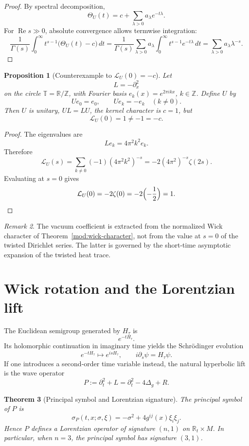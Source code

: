 \documentclass[11pt,a4paper]{article}
\numberwithin{equation}{section}
\newtheorem{theorem}{Theorem}[section]
\newtheorem{proposition}[theorem]{Proposition}
\theoremstyle{definition}
\theoremstyle{remark}
\newtheorem{remark}[theorem]{Remark}
\DeclareMathOperator{\Rea}{Re}
\newcommand{\RR}{\mathbb R}
\newcommand{\ZZ}{\mathbb Z}
\begin{document}
\begin{proof}
By spectral decomposition,
\[
\Theta_U(t)=c+\sum_{\lambda>0} a_\lambda e^{-t\lambda}.
\]
For $\Rea s\gg 0$, absolute convergence allows termwise integration:
\[
\frac{1}{\Gamma(s)}
\int_0^\infty t^{s-1}\bigl(\Theta_U(t)-c\bigr)\,dt
=
\frac{1}{\Gamma(s)}
\sum_{\lambda>0} a_\lambda \int_0^\infty t^{s-1}e^{-t\lambda}\,dt
=
\sum_{\lambda>0} a_\lambda\lambda^{-s}.
\]
\end{proof}

\begin{proposition}[Counterexample to $\mathcal L_U(0)=-c$]\label{mod:counterexample}
Let
\[
L=-\partial_x^2
\]
on the circle $\mathbb T=\RR/\ZZ$, with Fourier basis $e_k(x)=e^{2\pi ikx}$, $k\in\ZZ$.  Define $U$ by
\[
Ue_0=e_0,
\qquad
Ue_k=-e_k\quad (k\neq 0).
\]
Then $U$ is unitary, $UL=LU$, the kernel character is $c=1$, but
\[
\mathcal L_U(0)=1\neq -1=-c.
\]
\end{proposition}

\begin{proof}
The eigenvalues are
\[
Le_k=4\pi^2k^2e_k.
\]
Therefore
\[
\mathcal L_U(s)
=
\sum_{k\neq 0}(-1)(4\pi^2k^2)^{-s}
=
-2(4\pi^2)^{-s}\zeta(2s).
\]
Evaluating at $s=0$ gives
\[
\mathcal L_U(0)=-2\zeta(0)=-2\Bigl(-\frac12\Bigr)=1.
\]
\end{proof}

\begin{remark}
The vacuum coefficient is extracted from the normalized Wick character of Theorem~\ref{mod:wick-character}, not from the value at $s=0$ of the twisted Dirichlet series.  The latter is governed by the short-time asymptotic expansion of the twisted heat trace.
\end{remark}

\section{Wick rotation and the Lorentzian lift}

The Euclidean semigroup generated by $H_\tau$ is
\[
e^{-tH_\tau}.
\]
Its holomorphic continuation in imaginary time yields the Schr\"odinger evolution
\[
e^{-tH_\tau}\longmapsto e^{isH_\tau},
\qquad
i\partial_s\psi=H_\tau\psi.
\]
If one introduces a second-order time variable instead, the natural hyperbolic lift is the wave operator
\[
P:=\partial_t^2+L=\partial_t^2-4\Delta_g+R.
\]

\begin{theorem}[Principal symbol and Lorentzian signature]\label{mod:lorentzian}
The principal symbol of $P$ is
\[
\sigma_P(t,x;\sigma,\xi)=-\sigma^2+4g^{ij}(x)\xi_i\xi_j.
\]
Hence $P$ defines a Lorentzian operator of signature $(n,1)$ on $\RR_t\times M$.  In particular, when $n=3$, the principal symbol has signature $(3,1)$.
\end{theorem}
\end{document}
